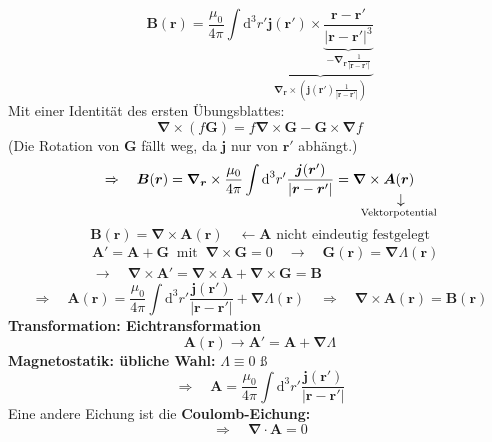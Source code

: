 \documentclass[titlepage,11pt,a4paper,ngerman]{report}
\newcommand{\tx}[1]{\textrm{#1}}
\newcommand{\ub}[1]{\underbrace{#1}}
\newcommand{\dd}{\tx{d}}
\newcommand{\custo}[3]{\underset{\scriptstyle\overset{\mkern4mu\rotatebox{-90}{$\,#1$}}{#3}}{#2}}
\renewcommand{\vec}[1]{\boldsymbol{#1}}
\newcommand{\vabla}{\boldsymbol{\nabla}}
\begin{document}
\begin{equation*}
\vec{B}(\vec{r}) = \frac{\mu_0}{4 \pi} \int \dd^3 r' \ub{\vec{j}(\vec{r'}) \times \ub{\frac{\vec{r} - \vec{r}'}{|\vec{r} - \vec{r}'|^3}}_{- \vabla_{\vec{r}} \frac{1}{|\vec{r} - \vec{r}'|}}}_{\vabla_{\vec{r}} \times \left(\vec{j}(\vec{r'}) \frac{1}{|\vec{r} - \vec{r}'|}\right)}
\end{equation*}
Mit einer Identität des ersten Übungsblattes:
\begin{equation*}
\vabla \times (f \vec{G}) = f \vabla \times \vec{G} - \vec{G} \times \vabla f
\end{equation*}
(Die Rotation von $ \vec{G} $ fällt weg, da $ \vec{j} $ nur von $ \vec{r}' $ abhängt.)
\begin{equation*}
\Rightarrow \quad \vec{B}(\vec{r}) = \vabla_{\vec{r}} \times \frac{\mu_0}{4 \pi} \int \dd^3 r'\frac{\vec{j}(\vec{r}')}{|\vec{r} - \vec{r}'|} = \vabla \times \custo{\rightarrow}{\vec{A}(\vec{r})}{\mathclap{\tx{Vektorpotential}}}
\end{equation*}
\begin{equation*}
\vec{B}(\vec{r}) = \vabla \times \vec{A}(\vec{r}) \quad \leftarrow \vec{A} \tx{ nicht eindeutig festgelegt}
\end{equation*}
\begin{align*}
& \vec{A}' = \vec{A} + \vec{G} \ \tx{ mit } \ \vabla \times \vec{G} = 0 \quad \rightarrow \quad \vec{G}(\vec{r}) = \vabla \Lambda (\vec{r})\\
& \rightarrow \quad \vabla \times \vec{A}' = \vabla \times \vec{A} + \vabla \times \vec{G} = \vec{B}
\end{align*}
\begin{equation*}
\Rightarrow \quad \vec{A}(\vec{r}) = \frac{\mu_0}{4 \pi} \int \dd^3 r' \frac{\vec{j}(\vec{r}')}{|\vec{r} - \vec{r}'|} + \vabla \Lambda (\vec{r}) \quad \Rightarrow \quad \vabla \times \vec{A}(\vec{r}) = \vec{B}(\vec{r})
\end{equation*}
\textbf{Transformation: Eichtransformation}
\begin{equation*}
\vec{A}(\vec{r}) \rightarrow \vec{A}' = \vec{A} + \vabla \Lambda
\end{equation*}
\textbf{Magnetostatik: übliche Wahl:} $ \Lambda \equiv 0 $
ß\begin{equation*}
\Rightarrow \quad \vec{A} = \frac{\mu_0}{4 \pi} \int \dd ^3 r' \frac{\vec{j}(\vec{r}')}{|\vec{r} - \vec{r}'|}
\end{equation*}
Eine andere Eichung ist die \textbf{Coulomb-Eichung:}
\begin{equation*}
\Rightarrow \quad \vabla \cdot \vec{A} = 0
\end{equation*}
\end{document}
